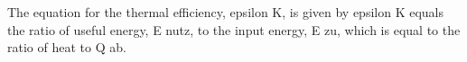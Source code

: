 The equation for the thermal efficiency, epsilon K, is given by epsilon K equals the ratio of useful energy, E nutz, to the input energy, E zu, which is equal to the ratio of heat to Q ab.